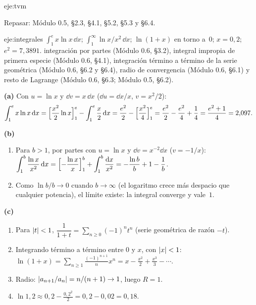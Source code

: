 \begin{solucion}{eje:tvm}

\noindent Repasar: Módulo 0.5, §2.3, §4.1, §5.2, §5.3 y §6.4.
\end{solucion}

\begin{solucion}{eje:integrales}
\datos $\int_1^{e}x\ln x\,\dd x$; $\int_1^{\infty}\ln x/x^{2}\,\dd x$; $\ln(1+x)$ en torno a~$0$; $x=0{,}2$; $e^{2}=7{,}3891$.
\planteamiento integración por partes (Módulo 0.6, §3.2), integral impropia de primera especie (Módulo 0.6, §4.1), integración término a término de la serie geométrica (Módulo 0.6, §6.2 y §6.4), radio de convergencia (Módulo 0.6, §6.1) y resto de Lagrange (Módulo 0.6, §6.3; Módulo 0.5, §6.2).
\pasos

\noindent\textbf{(a)} Con $u=\ln x$ y $\dd v=x\,\dd x$ ($\dd u=\dd x/x$, $v=x^{2}/2$):
\[
\int_1^{e}x\ln x\,\mathrm{d} x=\Bigl[\frac{x^{2}}{2}\ln x\Bigr]_1^{e}-\int_1^{e}\frac{x}{2}\,\mathrm{d} x=\frac{e^{2}}{2}-\Bigl[\frac{x^{2}}{4}\Bigr]_1^{e}=\frac{e^{2}}{2}-\frac{e^{2}}{4}+\frac14=\frac{e^{2}+1}{4}=2{,}097.
\]

\noindent\textbf{(b)}
\begin{enumerate}[label=\arabic*.]
  \item Para $b>1$, por partes con $u=\ln x$ y $\dd v=x^{-2}\dd x$ ($v=-1/x$): $\displaystyle\int_1^{b}\frac{\ln x}{x^{2}}\,\mathrm{d} x=\Bigl[-\frac{\ln x}{x}\Bigr]_1^{b}+\int_1^{b}\frac{\mathrm{d} x}{x^{2}}=-\frac{\ln b}{b}+1-\frac1b$.
  \item Como $\ln b/b\to0$ cuando $b\to\infty$ (el logaritmo crece más despacio que cualquier potencia), el límite existe: la integral converge y vale~$1$.
\end{enumerate}

\noindent\textbf{(c)}
\begin{enumerate}[label=\arabic*.]
  \item Para $\lvert t\rvert<1$, $\dfrac{1}{1+t}=\sum_{n\ge0}(-1)^{n}t^{n}$ (serie geométrica de razón $-t$).
  \item Integrando término a término entre $0$ y $x$, con $\lvert x\rvert<1$: $\ln(1+x)=\displaystyle\sum_{n\ge1}\frac{(-1)^{n+1}}{n}x^{n}=x-\frac{x^{2}}{2}+\frac{x^{3}}{3}-\cdots$.
  \item Radio: $\lvert a_{n+1}/a_n\rvert=n/(n+1)\to1$, luego $R=1$.
  \item $\ln1{,}2\approx0{,}2-\frac{0{,}2^{2}}{2}=0{,}2-0{,}02=0{,}18$.
\end{enumerate}


\end{solucion}
